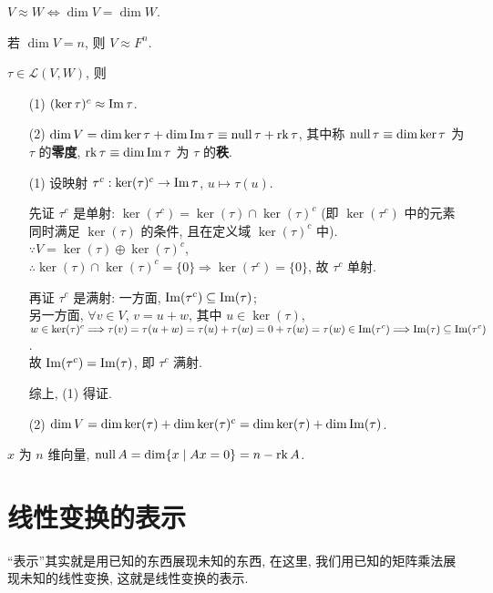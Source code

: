 \documentclass{note}
\begin{document}
\begin{thm}[(课本定理 2.6)]
    $V\approx W\Longleftrightarrow\dim V=\dim W$.
\end{thm}

\begin{thm}[(课本定理 2.7)]
    若 $\dim V=n$, 则 $V\approx F^n$.
\end{thm}

\begin{thm}[(课本定理 2.8)]
    $\tau\in\mathcal{L}(V,W)$, 则
    \begin{itemize}
        \item[(1)] $(\ker\tau)^c\approx\operatorname{Im}\tau$.
        \item[(2)] $\dim V=\dim\ker\tau+\dim\operatorname{Im}\tau\equiv\operatorname{null}\tau+\operatorname{rk}\tau$, 其中称 $\operatorname{null}\tau\equiv\dim\ker\tau$ 为 $\tau$ 的\textbf{零度}, $\operatorname{rk}\tau\equiv\dim\operatorname{Im}\tau$ 为 $\tau$ 的\textbf{秩}.
    \end{itemize}
\end{thm}
\begin{pf}
    \begin{itemize}
        \item[(1)] 设映射 $\tau^c:\ker(\tau)^c\rightarrow\operatorname{Im}\tau$, $u\mapsto\tau(u)$.

        先证 $\tau^c$ 是单射: $\ker(\tau^c)=\ker(\tau)\cap\ker(\tau)^c$ (即 $\ker(\tau^c)$ 中的元素同时满足 $\ker(\tau)$ 的条件, 且在定义域 $\ker(\tau)^c$ 中).\\
        $\because V=\ker(\tau)\oplus\ker(\tau)^c$, $\therefore\ker(\tau)\cap\ker(\tau)^c=\{0\}\Longrightarrow\ker(\tau^c)=\{0\}$, 故 $\tau^c$ 单射.

        再证 $\tau^c$ 是满射: 一方面, $\operatorname{Im}(\tau^c)\subseteq\operatorname{Im}(\tau)$;\\
        另一方面, $\forall v\in V$, $v=u+w$, 其中 $u\in\ker(\tau)$, $w\in\ker(\tau)^c\Longrightarrow\tau(v)=\tau(u+w)=\tau(u)+\tau(w)=0+\tau(w)=\tau(w)\in\operatorname{Im}(\tau^c)\Longrightarrow\operatorname{Im}(\tau)\subseteq\operatorname{Im}(\tau^c)$.\\
        故 $\operatorname{Im}(\tau^c)=\operatorname{Im}(\tau)$, 即 $\tau^c$ 满射.

        综上, (1) 得证.
        \item[(2)] $\dim V=\dim\ker(\tau)+\dim\ker(\tau)^c=\dim\ker(\tau)+\dim\operatorname{Im}(\tau)$.
    \end{itemize}
\end{pf}

$x$ 为 $n$ 维向量, $\operatorname{null} A=\dim\{x\mid Ax=0\}=n-\operatorname{rk} A$.

\section{线性变换的表示}
``表示''其实就是用已知的东西展现未知的东西, 在这里, 我们用已知的矩阵乘法展现未知的线性变换, 这就是线性变换的表示.
\end{document}
